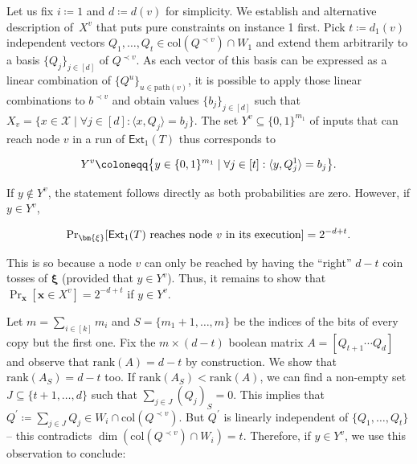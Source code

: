 Let us fix $i\coloneqq 1$ and $d\coloneqq d(v)$ for simplicity. We establish and alternative description of $X^{v}$ that puts pure constraints on instance 1 first. Pick $t\coloneqq d_{1}(v)$ independent vectors $Q_{1},\ldots,Q_{t}\in\mathrm{col}(Q^{\prec v})\cap W_{1}$ and extend them arbitrarily to a basis $\{Q_{j}\}_{j\in[d]}$ of $Q^{\prec v}$. As each vector of this basis can be expressed as a linear combination of $\{Q^{u}\}_{u\in\mathrm{path}(v)}$, it is possible to apply those linear combinations to $b^{\prec v}$ and obtain values $\{b_{j}\}_{j\in[d]}$ such that $X_{v}=\{x\in\mathcal{X}\mid\forall j\in[d]:\langle x,Q_{j}\rangle=b_{j}\}$. The set $Y^{v}\subseteq\{0,1\}^{m_{1}}$ of inputs that can reach node $v$ in a run of $\mathsf{Ext}_{1}\mathopen{}\left(T\mathclose{}\right)$ thus corresponds to\par


\[\begin{gathered}
Y^{v}\coloneqq\big{\{}y\in\{0,1\}^{m_{1}}\mid\forall j\in[t]:\langle y,Q_{j}^{1}\rangle=b_{j}\big{\}}.
\end{gathered}\]


If $y\notin Y^{v}$, the statement follows directly as both probabilities are zero. However, if $y\in Y^{v}$,\par


\[\begin{gathered}
\Pr\nolimits_{\bm{\xi}}[\textup{$\mathsf{Ext}_{1}\mathopen{}\left(T\mathclose{}\right)$ reaches node $v$ in its execution}]=2^{-d+t}.
\end{gathered}\]


This is so because a node $v$ can only be reached by having the “right” $d-t$ coin tosses of $\bm{\xi}$ (provided that $y\in Y^{v}$). Thus, it remains to show that $\Pr_{\bm{x}}[\bm{x}\in X^{v}]=2^{-d+t}$ if $y\in Y^{v}$.\par




Let $m=\sum_{i\in[k]}m_{i}$ and $S=\{m_{1}+1,\dots,m\}$ be the indices of the bits of every copy but the first one. Fix the $m\times(d-t)$ boolean matrix $A=[Q_{t+1}\cdots Q_{d}]$ and observe that $\mathrm{rank}(A)=d-t$ by construction. We show that $\mathrm{rank}(A_{S})=d-t$ too. If $\mathrm{rank}(A_{S})<\mathrm{rank}(A)$, we can find a non-empty set $J\subseteq\{t+1,\ldots,d\}$ such that $\sum_{j\in J}(Q_{j})_{S}=0$. This implies that $Q^{\prime}\coloneqq\sum_{j\in J}Q_{j}\in W_{i}\cap\mathrm{col}(Q^{\prec v})$. But $Q^{\prime}$ is linearly independent of $\{Q_{1},\ldots,Q_{t}\}$ – this contradicts $\dim(\mathrm{col}(Q^{\prec v})\cap W_{i})=t$. Therefore, if $y\in Y^{v}$, we use this observation to conclude:\par


